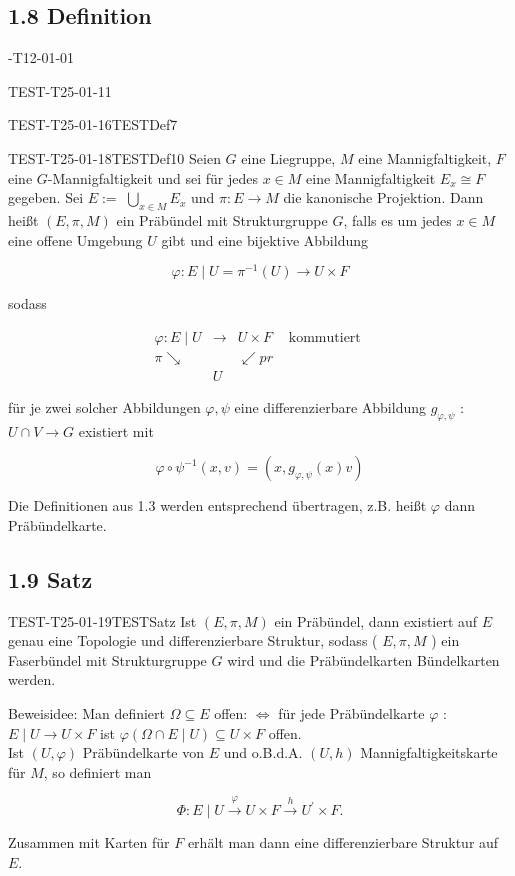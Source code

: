 \subsection*{1.8 Definition}
\begin{DEF}{-T12-01-01}{}
\begin{DEF}{TEST-T25-01-11}{}
\begin{DEF}{TEST-T25-01-16}{TESTDef7}
\begin{DEF}{TEST-T25-01-18}{TESTDef10}
Seien $G$ eine Liegruppe, $M$ eine Mannigfaltigkeit, $F$ eine $G$-Mannigfaltigkeit und sei für jedes $x \in M$ eine Mannigfaltigkeit $E_{x} \cong F$ gegeben. Sei $E:=$ $\bigcup_{x \in M} E_{x}$ und $\pi: E \rightarrow M$ die kanonische Projektion. Dann heißt $(E, \pi, M)$ ein Präbündel mit Strukturgruppe $G$, falls es um jedes $x \in M$ eine offene Umgebung $U$ gibt und eine bijektive Abbildung

$$
\varphi: E \mid U=\pi^{-1}(U) \rightarrow U \times F
$$

sodass

$$
\begin{array}{rlll}
\varphi: E \mid U & \longrightarrow & U \times F & \text { kommutiert } \\
\pi \searrow & & \swarrow p r & \\
& U & &
\end{array}
$$

für je zwei solcher Abbildungen $\varphi, \psi$ eine differenzierbare Abbildung $g_{\varphi, \psi}$ : $U \cap V \rightarrow G$ existiert mit

$$
\varphi \circ \psi^{-1}(x, v)=\left(x, g_{\varphi, \psi}(x) v\right)
$$

Die Definitionen aus 1.3 werden entsprechend übertragen, z.B. heißt $\varphi$ dann Präbündelkarte.
\end{DEF}
\end{DEF}
\end{DEF}
\end{DEF}

\subsection*{1.9 Satz}
\begin{THEO}{TEST-T25-01-19}{TESTSatz}
Ist $(E, \pi, M)$ ein Präbündel, dann existiert auf $E$ genau eine Topologie und differenzierbare Struktur, sodass ( $E, \pi, M$ ) ein Faserbündel mit Strukturgruppe $G$ wird und die Präbündelkarten Bündelkarten werden.

Beweisidee: Man definiert $\Omega \subseteq E$ offen: $\Leftrightarrow$ für jede Präbündelkarte $\varphi$ : $E \mid U \rightarrow U \times F$ ist $\varphi(\Omega \cap E \mid U) \subseteq U \times F$ offen.\\
Ist $(U, \varphi)$ Präbündelkarte von $E$ und o.B.d.A. $(U, h)$ Mannigfaltigkeitskarte für $M$, so definiert man

$$
\Phi: E \mid U \xrightarrow{\varphi} U \times F \xrightarrow{h} U^{\prime} \times F .
$$

Zusammen mit Karten für $F$ erhält man dann eine differenzierbare Struktur auf $E$.
\end{THEO}

